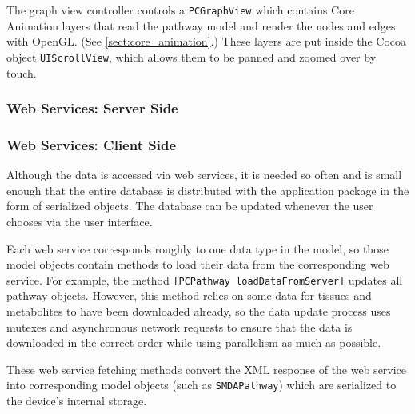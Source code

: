 The graph view controller controls a \texttt{PCGraphView} which contains Core
Animation layers that read the pathway model and render the nodes and edges with
OpenGL. (See \ref{sect:core_animation}.) These layers are put inside the
Cocoa object \texttt{UIScrollView}, which allows them to be panned and zoomed
over by touch.

\subsubsection{Web Services: Server Side}

\subsubsection{Web Services: Client Side}
\label{sect:maw_web_services}

Although the data is accessed via web services, it is needed so often and is
small enough that the entire database is distributed with the application
package in the form of serialized objects. The database can be updated whenever
the user chooses via the user interface.

Each web service corresponds roughly to one data type in the model, so those
model objects contain methods to load their data from the corresponding web
service. For example, the method \texttt{[PCPathway loadDataFromServer]}
updates all pathway objects. However, this method relies on some data for
tissues and metabolites to have been downloaded already, so the data update
process uses mutexes and asynchronous network requests to ensure that the data
is downloaded in the correct order while using parallelism as much as possible.

These web service fetching methods convert the XML response of the web service
into corresponding model objects (such as \texttt{SMDAPathway}) which are
serialized to the device's internal storage.

